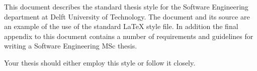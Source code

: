 This document describes the standard thesis style for the Software
Engineering department at Delft University of Technology. The document
and its source are an example of the use of the standard \LaTeX{} style
file. In addition the final appendix to this document contains a
number of requirements and guidelines for writing a Software
Engineering MSc thesis.

Your thesis should either employ this style or follow it closely.
